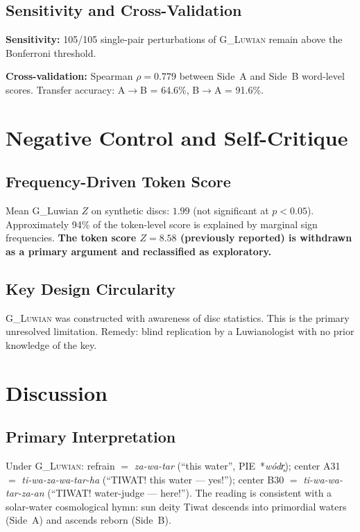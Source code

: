 \documentclass[12pt,a4paper]{article}
\begin{document}
\subsection{Sensitivity and Cross-Validation}

\textbf{Sensitivity:} 105/105 single-pair perturbations of \textsc{G\_Luwian} remain above the Bonferroni threshold.

\textbf{Cross-validation:} Spearman $\rho = 0.779$ between Side~A and Side~B word-level scores. Transfer accuracy: A$\to$B = 64.6\%, B$\to$A = 91.6\%.

\section{Negative Control and Self-Critique}

\subsection{Frequency-Driven Token Score}

Mean G\_Luwian $Z$ on synthetic discs: $1.99$ (not significant at $p < 0.05$). Approximately 94\% of the token-level score is explained by marginal sign frequencies. \textbf{The token score $Z = 8.58$ (previously reported) is withdrawn as a primary argument and reclassified as exploratory.}

\subsection{Key Design Circularity}

\textsc{G\_Luwian} was constructed with awareness of disc statistics. This is the primary unresolved limitation. Remedy: blind replication by a Luwianologist with no prior knowledge of the key.

\section{Discussion}

\subsection{Primary Interpretation}

Under \textsc{G\_Luwian}: refrain $=$ \textit{za-wa-tar} (``this water'', PIE~*\textit{wódr̥}); center A31 $=$ \textit{ti-wa-za-wa-tar-ha} (``TIWAT! this water --- yes!''); center B30 $=$ \textit{ti-wa-wa-tar-za-an} (``TIWAT! water-judge --- here!''). The reading is consistent with a solar-water cosmological hymn: sun deity Tiwat descends into primordial waters (Side~A) and ascends reborn (Side~B).
\end{document}
